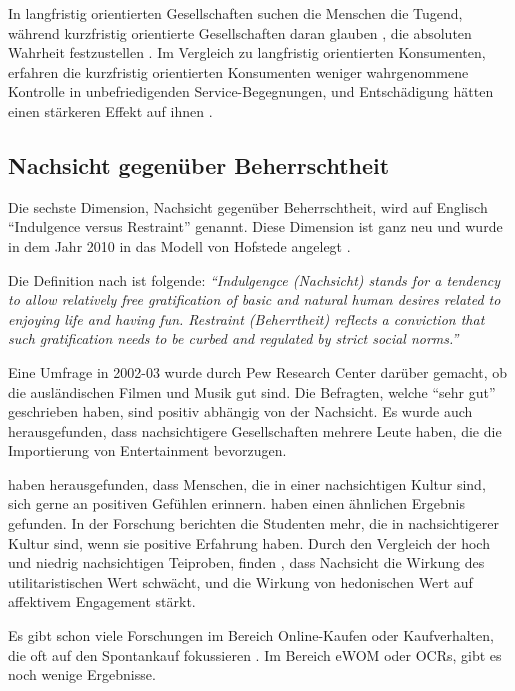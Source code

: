 In langfristig orientierten Gesellschaften suchen die Menschen die Tugend, während kurzfristig orientierte Gesellschaften daran glauben , die absoluten Wahrheit festzustellen \citep{Sohaib2014}. Im Vergleich zu langfristig orientierten Konsumenten, erfahren die kurzfristig orientierten Konsumenten weniger wahrgenommene Kontrolle in unbefriedigenden Service-Begegnungen, und Entschädigung hätten einen stärkeren Effekt auf ihnen \citep{Hui2001161, patrick2004attributions}.
\subsection{Nachsicht gegenüber Beherrschtheit}
Die sechste Dimension, Nachsicht gegenüber Beherrschtheit, wird auf Englisch ``Indulgence versus Restraint'' genannt. Diese Dimension ist ganz neu und wurde in dem Jahr 2010 in das Modell von Hofstede angelegt \citep[p.~ 285]{hofstede2010cultures}. 

Die Definition nach \citet{hofstede2010cultures} ist folgende: \emph{``Indulgengce (Nachsicht) stands for a tendency to allow relatively free gratification of basic and natural human desires related to enjoying life and having fun. Restraint (Beherrtheit) reflects a conviction that such gratification needs to be curbed and regulated by strict social norms.''}

Eine Umfrage in 2002-03 wurde durch Pew Research Center darüber gemacht, ob die ausländischen Filmen und Musik gut sind. Die Befragten, welche ``sehr gut'' geschrieben haben, sind positiv abhängig von der Nachsicht. Es wurde auch herausgefunden, dass nachsichtigere Gesellschaften mehrere Leute haben, die die Importierung von Entertainment bevorzugen. \citep[p.~292]{hofstede2010cultures}

\citet{kuppens2006universal} haben herausgefunden, dass Menschen, die in einer nachsichtigen Kultur sind, sich gerne an positiven Gefühlen erinnern. \citet{schimmack2002cultural} haben einen ähnlichen Ergebnis gefunden. In der Forschung berichten die Studenten mehr, die in nachsichtigerer Kultur sind, wenn sie positive Erfahrung haben. Durch den Vergleich der hoch und niedrig nachsichtigen Teiproben, finden \citet{Zhou2015}, dass Nachsicht die Wirkung des utilitaristischen Wert schwächt, und die Wirkung von hedonischen Wert auf affektivem Engagement stärkt. 

Es gibt schon viele Forschungen im Bereich Online-Kaufen oder Kaufverhalten, die oft auf den Spontankauf fokussieren \citep{sharma2005self}. Im Bereich \ac{eWOM} oder \ac{OCRs}, gibt es noch wenige Ergebnisse.


